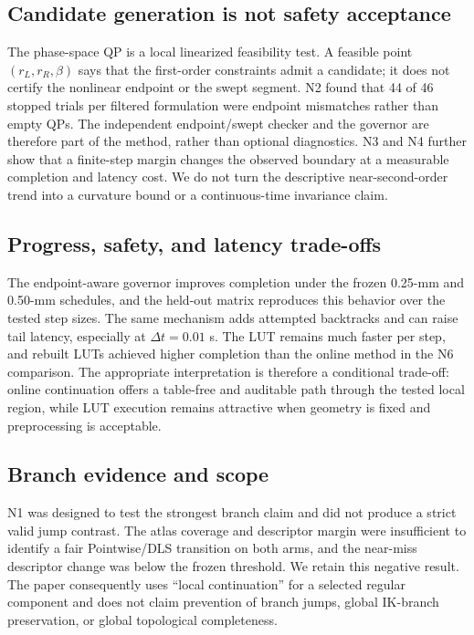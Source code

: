 \documentclass[preprint,12pt]{elsarticle}
\begin{document}
\subsection{Candidate generation is not safety acceptance}

The phase-space QP is a local linearized feasibility test. A feasible point $(r_L,r_R,\beta)$ says that the first-order constraints admit a candidate; it does not certify the nonlinear endpoint or the swept segment. N2 found that 44 of 46 stopped trials per filtered formulation were endpoint mismatches rather than empty QPs. The independent endpoint/swept checker and the governor are therefore part of the method, rather than optional diagnostics. N3 and N4 further show that a finite-step margin changes the observed boundary at a measurable completion and latency cost. We do not turn the descriptive near-second-order trend into a curvature bound or a continuous-time invariance claim.

\subsection{Progress, safety, and latency trade-offs}

The endpoint-aware governor improves completion under the frozen 0.25-mm and 0.50-mm schedules, and the held-out matrix reproduces this behavior over the tested step sizes. The same mechanism adds attempted backtracks and can raise tail latency, especially at $\Delta t=0.01$ s. The LUT remains much faster per step, and rebuilt LUTs achieved higher completion than the online method in the N6 comparison. The appropriate interpretation is therefore a conditional trade-off: online continuation offers a table-free and auditable path through the tested local region, while LUT execution remains attractive when geometry is fixed and preprocessing is acceptable.

\subsection{Branch evidence and scope}

N1 was designed to test the strongest branch claim and did not produce a strict valid jump contrast. The atlas coverage and descriptor margin were insufficient to identify a fair Pointwise/DLS transition on both arms, and the near-miss descriptor change was below the frozen threshold. We retain this negative result. The paper consequently uses ``local continuation'' for a selected regular component and does not claim prevention of branch jumps, global IK-branch preservation, or global topological completeness.
\end{document}
